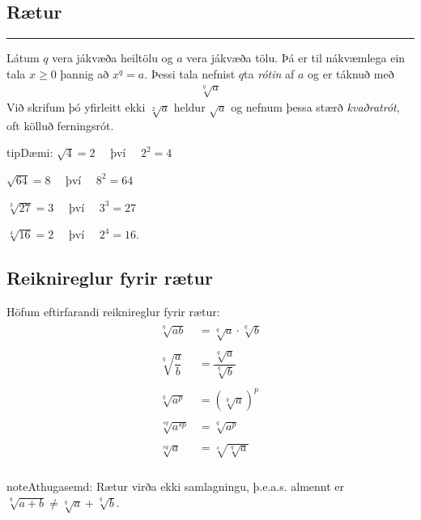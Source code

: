 \documentclass[a4paper,10pt,icelandic]{sphinxmanual}
\begin{document}
\subsection{Rætur}
\label{\detokenize{Kafli01:raetur}}

\bigskip\hrule\bigskip


Látum \(q\) vera jákvæða heiltölu og \(a\) vera jákvæða tölu. Þá er til nákvæmlega ein tala \(x \geq 0\) þannig að \(x^q=a\). Þessi tala nefnist \(q\)\sphinxhyphen{}ta \textit{rótin} af \(a\) og er táknuð með
\begin{equation*}
\begin{split}\sqrt[q]{a}\end{split}
\end{equation*}
Við skrifum þó yfirleitt ekki \(\sqrt[2]{a}\) heldur \(\sqrt{a}\) og nefnum þessa stærð \textit{kvaðratrót}, oft kölluð ferningsrót.

\begin{sphinxadmonition}{tip}{Dæmi:}
 \(\sqrt{4}=2 \quad\) því \(\quad 2^2=4\)

 \(\sqrt{64}=8 \quad\) því \(\quad 8^2=64\)

 \(\sqrt[3]{27}=3 \quad\) því \(\quad 3^3=27\)

 \(\sqrt[4]{16}=2 \quad\) því \(\quad 2^4=16\).
\end{sphinxadmonition}


\subsection{Reiknireglur fyrir rætur}
\label{\detokenize{Kafli01:reiknireglur-fyrir-raetur}}
Höfum eftirfarandi reiknireglur fyrir rætur:
\begin{equation*}
\begin{split}      \begin{aligned}
        \sqrt[q]{ab} &=\sqrt[q]{a}\cdot \sqrt[q]{b} \\
  & \qquad \\
  \sqrt[q]{\dfrac ab}& =\dfrac{\sqrt[q]{a}}{\sqrt[q] {b}}\\
  & \qquad \\
  \sqrt[q]{a^p}& =(\sqrt[q]{a})^p\\
  & \qquad \\
  \sqrt[sq]{a^{sp}} &={\sqrt[q]{a^p}}\\
  & \qquad \\
  \sqrt[sq]{ a} &=\sqrt[s]{\sqrt[q]{a}}\\
\end{aligned}\end{split}
\end{equation*}
\begin{sphinxadmonition}{note}{Athugasemd:}
Rætur virða ekki samlagningu, þ.e.a.s. almennt er \(\sqrt[q]{a+b} \neq \sqrt[q]{a}+ \sqrt[q]{b}\).
\end{sphinxadmonition}
\end{document}
